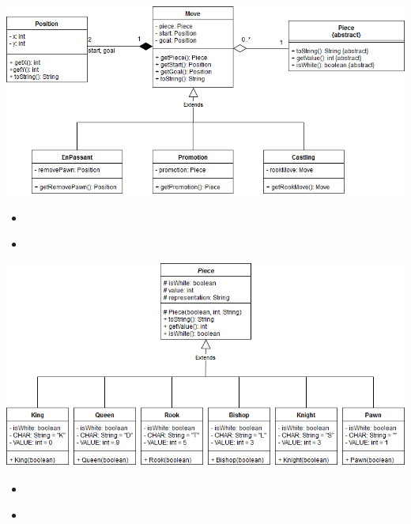 \documentclass[parskip=full]{scrartcl}
\begin{document}
		\begin{minipage}{\linewidth}
			\centering
			\includegraphics[width=1\linewidth]{Diagramme/Move}
			\label{fig:move}
		\end{minipage}
		\begin{itemize}
			\item
				\begin{description}
				
				\end{description}
			\item
				\begin{description}
				
				\end{description}
		\end{itemize}
		\newpage
		
		\begin{minipage}{\linewidth}
		\centering
		\includegraphics[width=1\linewidth]{Diagramme/Pieces}
		\label{fig:pieces}
		\end{minipage}
		\begin{itemize}
			\item
				\begin{description}
				
				\end{description}
			\item
				\begin{description}
				
				\end{description}
		\end{itemize}		
		\newpage		
		
\end{document}
